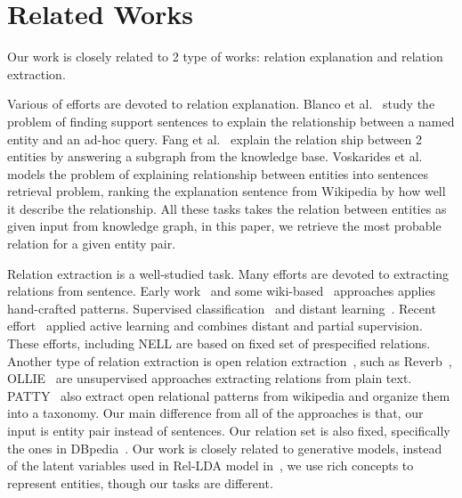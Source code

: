 \section{Related Works}
\label{sec:rel}

Our work is closely related to 2 type of works: relation explanation and relation extraction.

Various of efforts are devoted to relation explanation.
Blanco et al.~\cite{blanco2010finding} study the problem of finding support sentences to explain the relationship between a named entity and an ad-hoc query.
Fang et al.~\cite{fang2011rex} explain the relation ship between 2 entities by answering a subgraph from the knowledge base.
Voskarides et al.~\cite{voskarideslearning} models the problem of explaining relationship between entities into sentences retrieval problem, ranking the explanation sentence from Wikipedia by how well it describe the relationship.
All these tasks takes the relation between entities as given input from knowledge graph, in this paper, we retrieve the most probable relation for a given entity pair.

Relation extraction is a well-studied task.
Many efforts are devoted to extracting relations from sentence.
Early work~\cite{hearst1992automatic,brin1999extracting,agichtein2000snowball} and some wiki-based~\cite{ponzetto2008wikitaxonomy} approaches applies hand-crafted patterns.
Supervised classification~\cite{doddington2004automatic,guodong2005exploring} and distant learning~\cite{craven1999constructing,wu2007autonomously,bunescu2007learning,mintz2009distant}.
Recent effort~\cite{angeli2014combining} applied active learning and combines distant and partial supervision.
These efforts, including NELL are based on  fixed set of prespecified relations.
Another type of relation extraction is open relation extraction~\cite{banko2007open}, such as Reverb~\cite{fader2011identifying}, OLLIE~\cite{schmitz2012open} are unsupervised approaches extracting relations from plain text.
PATTY~\cite{nakashole2012patty} also extract open relational patterns from wikipedia and organize them into a taxonomy.
Our main difference from all of the approaches is that, our input is entity pair instead of sentences.
Our relation set is also fixed, specifically the ones in DBpedia~\cite{auer2007dbpedia}.
Our work is closely related to generative models, instead of the latent variables used in Rel-LDA model in~\cite{yao2011structured}, we use rich concepts to represent entities, though our tasks are different.



